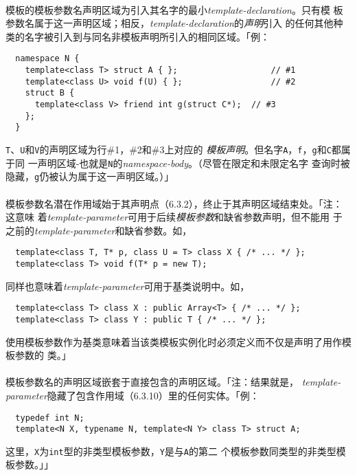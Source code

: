 \paragraph{}
模板的模板参数名声明区域为引入其名字的最小\textit{template-declaration}。只有模
板参数名属于这一声明区域；相反，\textit{template-declaration}的\textit{声明}引入
的任何其他种类的名字被引入到与同名非模板声明所引入的相同区域。「例：
\begin{lstlisting}
  namespace N {
    template<class T> struct A { };                   // #1
    template<class U> void f(U) { };                  // #2
    struct B {
      template<class V> friend int g(struct C*);  // #3
    };
  }
\end{lstlisting}
\texttt{T}、\texttt{U}和\texttt{V}的声明区域为行\#1，\#2和\#3上对应的
\textit{模板声明}。但名字\texttt{A}，\texttt{f}，\texttt{g}和\texttt{C}都属于同
一声明区域-也就是\texttt{N}的\textit{namespace-body}。（尽管在限定和未限定名字
查询时被隐藏，\texttt{g}仍被认为属于这一声明区域。）」

\paragraph{}
模板参数名潜在作用域始于其声明点（6.3.2），终止于其声明区域结束处。「注：这意味
着\textit{template-parameter}可用于后续\textit{模板参数}和缺省参数声明，但不能用
于之前的\textit{template-parameter}和缺省参数。如，
\begin{lstlisting}
  template<class T, T* p, class U = T> class X { /* ... */ };
  template<class T> void f(T* p = new T);
\end{lstlisting}
同样也意味着\textit{template-parameter}可用于基类说明中。如，
\begin{lstlisting}
  template<class T> class X : public Array<T> { /* ... */ };
  template<class T> class Y : public T { /* ... */ };
\end{lstlisting}
使用模板参数作为基类意味着当该类模板实例化时必须定义而不仅是声明了用作模板参数的
类。」

\paragraph{}
模板参数名的声明区域嵌套于直接包含的声明区域。「注：结果就是，
\textit{template-parameter}隐藏了包含作用域（6.3.10）里的任何实体。「例：
\begin{lstlisting}
  typedef int N;
  template<N X, typename N, template<N Y> class T> struct A;
\end{lstlisting}
这里，\texttt{X}为\texttt{int}型的非类型模板参数，\texttt{Y}是与\texttt{A}的第二
个模板参数同类型的非类型模板参数。」」

